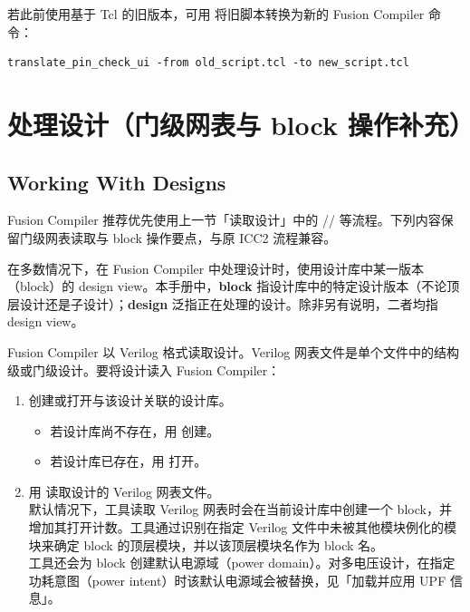若此前使用基于 Tcl 的旧版本，可用  将旧脚本转换为新的 Fusion Compiler 命令：
\begin{lstlisting}
translate_pin_check_ui -from old_script.tcl -to new_script.tcl
\end{lstlisting}



\section{处理设计（门级网表与 block 操作补充）}
\subsection*{Working With Designs}

\begin{noteBox}
Fusion Compiler 推荐优先使用上一节「读取设计」中的 // 等流程。下列内容保留门级网表读取与 block 操作要点，与原 ICC2 流程兼容。
\end{noteBox}

在多数情况下，在 Fusion Compiler 中处理设计时，使用设计库中某一版本（block）的 design view。本手册中，\textbf{block} 指设计库中的特定设计版本（不论顶层设计还是子设计）；\textbf{design} 泛指正在处理的设计。除非另有说明，二者均指 design view。

Fusion Compiler 以 Verilog 格式读取设计。Verilog 网表文件是单个文件中的结构级或门级设计。要将设计读入 Fusion Compiler：
\begin{enumerate}
  \item 创建或打开与该设计关联的设计库。
    \begin{itemize}
      \item 若设计库尚不存在，用  创建。
      \item 若设计库已存在，用  打开。
    \end{itemize}
  \item 用  读取设计的 Verilog 网表文件。\\
    默认情况下，工具读取 Verilog 网表时会在当前设计库中创建一个 block，并增加其打开计数。工具通过识别在指定 Verilog 文件中未被其他模块例化的模块来确定 block 的顶层模块，并以该顶层模块名作为 block 名。\\
    工具还会为 block 创建默认电源域（power domain）。对多电压设计，在指定功耗意图（power intent）时该默认电源域会被替换，见「加载并应用 UPF 信息」。
\end{enumerate}

